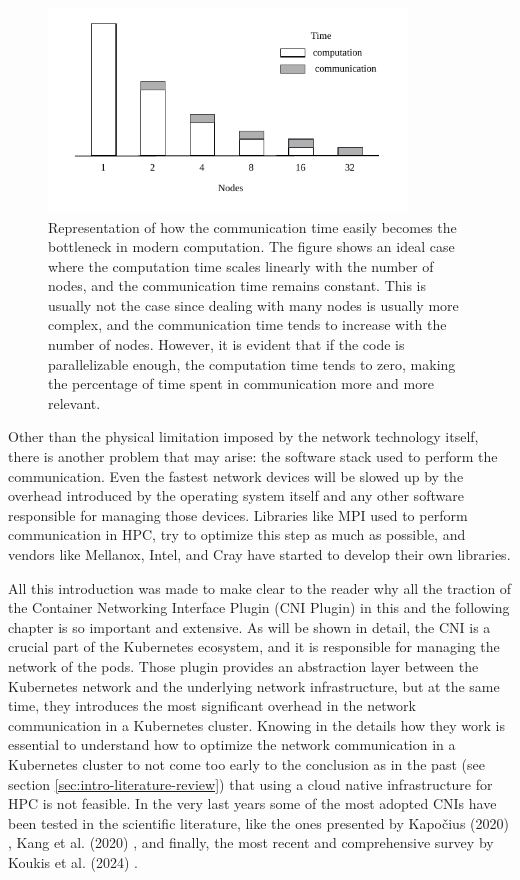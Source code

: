 \begin{figure}[h]
  \centering
  \includegraphics[width=0.85\textwidth]{img/chpt2/scaling}
  \caption{Representation of how the communication time easily becomes the
    bottleneck in modern computation. The figure shows an ideal case where
    the computation time scales linearly with the number of nodes, and the
    communication time remains constant. This is usually not the case since
    dealing with many nodes is usually more complex, and the
    communication time tends to increase with the number of nodes. However, it is
    evident that if the code is parallelizable enough, the computation time
    tends to zero, making the percentage of time spent in communication more and
    more relevant.}
  \label{fig:scaling}
\end{figure}


Other than the physical limitation imposed by the network technology itself,
there is another problem that may arise: the software stack used to perform the
communication. Even the fastest network devices will be slowed up by the
overhead introduced by the operating system itself and any other software
responsible for managing those devices.
Libraries like MPI used to perform communication in HPC, try to optimize this
step as much as possible, and vendors like Mellanox, Intel, and Cray have started
to develop their own libraries.

All this introduction was made to make clear to the reader why all the traction of the
Container Networking Interface Plugin (CNI Plugin) in this and the following
chapter is so important and extensive. As will be shown in detail, the CNI is
a crucial part of the Kubernetes ecosystem, and it is responsible for managing
the network of the pods.
Those plugin provides an abstraction layer between the Kubernetes network and
the underlying network infrastructure, but at the same time, they introduces the
most significant overhead in the network communication in a Kubernetes cluster.
Knowing in the details how they work is essential to understand how to optimize
the network communication in a Kubernetes cluster to not come too early to the
conclusion as in the past (see section \ref{sec:intro-literature-review}) that
using a cloud native infrastructure for HPC is not feasible.
In the very last years some of the most adopted CNIs have been tested in the
scientific literature, like the ones presented by Kapočius (2020)
\cite{Kapoius2020}, Kang et al. (2020) \cite{Kang2021}, and finally, the most
recent and comprehensive survey by Koukis et al. (2024) \cite{Koukis2024}.


